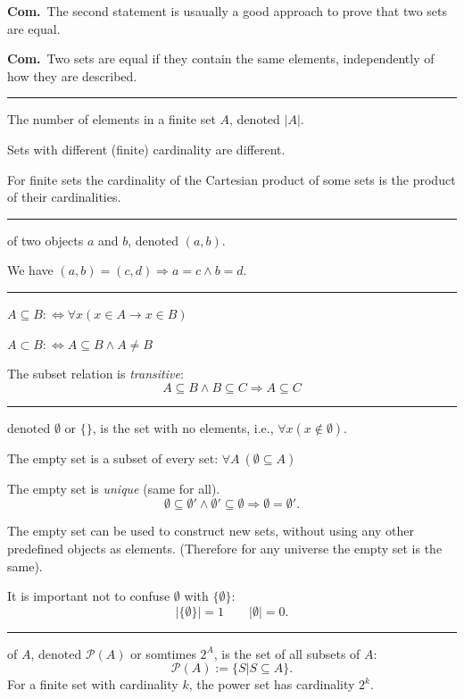 \documentclass[a4paper]{extarticle}
\newcommand{\Com}{\textbf{Com.}\ }
\newcommand{\card}[1]{\lvert #1 \rvert}
\newcommand{\sep}{\vspace{5pt}\noindent\hrule\vspace{5pt}}
\begin{document}
\begin{multicols*}{2}
\Com The second statement is usaually a good approach to prove that two sets are
equal.

\Com Two sets are equal if they contain the same elements, independently of how
they are described.

\sep

\Def[Cardinality] The number of elements in a finite set $A$, denoted
$\card{A}$.

\Lem Sets with different (finite) cardinality are different.

\Lem For finite sets the cardinality of the Cartesian product of some sets is
the product of their cardinalities.

\sep

 of two objects $a$ and $b$, denoted $(a,b)$.

\Lem We have $(a,b)=(c,d)\Longrightarrow a=c \land b = d$.

\sep

\Def[Subset] $A\subseteq B:\Longleftrightarrow \forall x (x\in A\rightarrow
x\in B)$

 $A \subset B :\Longleftrightarrow A \subseteq B \land A\neq
B$

\Lem The subset relation is \emph{transitive}:
\[
A\subseteq B \land B \subseteq C \Rightarrow A \subseteq C
\]

\sep

 denoted $\emptyset$ or $\{\}$, is the set with
no elements, i.e., $\forall x (x\notin \emptyset)$. 

\Lem The empty set is a subset of every set: $\forall A \ (\emptyset \subseteq
A)$

\Lem The empty set is \emph{unique} (same for all).
\[\emptyset \subseteq \emptyset ' \land
\emptyset ' \subseteq \emptyset \Rightarrow \emptyset = \emptyset '.
\]

The empty set can be used to construct new sets, without using any other
predefined objects as elements. (Therefore for any universe the empty set is the
same).

It is important not to confuse $\emptyset$ with $\{\emptyset\}$:
\[
\card{\{\emptyset\}}=1 \qquad \card{\emptyset}=0.
\]

\sep

 of $A$, denoted $\mathcal{P}(A)$ or
somtimes $2^{A}$, is the set of all subsets of $A$:
\[
\mathcal{P}(A):= \{S|S\subseteq A\}.
\]
\Thm For a finite set with cardinality $k$, the power set has cardinality $2^k$.


\end{multicols*}
\end{document}
